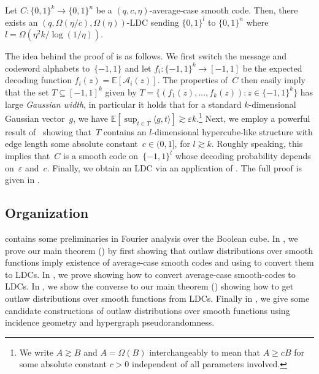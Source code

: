 \documentclass{toc}
\newcommand{\bset}[1]{\{0,1\}^{#1}} %
\newcommand{\pmset}[1]{\{-1,1\}^{#1}} %
\newcommand{\sBC}{{\{-1,1\}}}
\newcommand{\Exp}{{\mathbb{E}}}
\newcommand{\E}{\mathbb{E}}
\newcommand{\eps}{\varepsilon}
\newcommand{\cA}{{\mathcal A}}
\begin{document}
\begin{lemma}\label{lem:ave2ldc}
Let $C:\bset{k}\to \bset{n}$ be a $(q,c,\eta)$-average-case smooth code. 
Then, there exists an $(q,\Omega(\eta/c), \Omega(\eta))$-LDC sending $\bset{l}$ to $\bset{n}$ where $l=\Omega(\eta^2 k/\log(1/\eta))$.
\end{lemma}

The idea behind the proof of  is as follows.
We first switch the message and codeword alphabets to~$\pmset{}$ and let $f_i:\pmset{k}\to [-1,1]$ be the expected decoding function $f_i(z)=\E[\cA_i(z)]$.
The properties of~$C$ then easily imply that the set $T\subseteq [-1,1]^k$ given by $T=\{(f_1(z),\dots,f_k(z)):z\in \sBC^k\}$ has large \emph{Gaussian width}, in particular it holds that for a standard $k$-dimensional Gaussian vector~$g$, we have $\Exp[\sup_{t\in T}\langle g, t\rangle]  \gtrsim \eps k$.\footnote{We write $A\gtrsim B$ and $A=\Omega(B)$ interchangeably to mean that $A\ge c B$ for some absolute constant $c>0$ independent of all parameters involved.}
Next, we employ a powerful result of~\cite{Mendelson:2003} showing that~$T$ contains an $l$-dimensional hypercube-like structure with edge length some absolute constant~$c\in (0,1]$, for $l \gtrsim k$.
Roughly speaking, this implies that~$C$ is a smooth code on~$\pmset{l}$ whose decoding probability depends on~$\eps$ and~$c$.
Finally, we obtain an LDC via an application of .
The full proof is given in .


\subsection{Organization}
 contains some preliminaries in Fourier analysis over the Boolean cube. In , we prove our main theorem () by first showing that outlaw distributions over smooth functions imply existence of average-case smooth codes and using  to convert them to LDCs. In , we prove  showing how to convert average-case smooth-codes to LDCs. In , we show the converse to our main theorem () showing how to get outlaw distributions over smooth functions from LDCs. Finally in , we give some candidate constructions of outlaw distributions over smooth functions using incidence geometry and hypergraph pseudorandomness.
\end{document}
